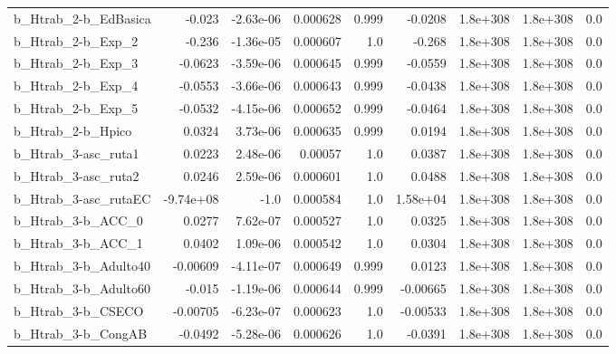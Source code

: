 \begin{tabular}{lrrrrrrrr}
b\_Htrab\_2-b\_EdBasica         &      -0.023 &    -2.63e-06 &  0.000628 &    0.999 &    -0.0208 &    1.8e+308 &     1.8e+308 &           0.0 \\
b\_Htrab\_2-b\_Exp\_2            &      -0.236 &    -1.36e-05 &  0.000607 &      1.0 &     -0.268 &    1.8e+308 &     1.8e+308 &           0.0 \\
b\_Htrab\_2-b\_Exp\_3            &     -0.0623 &    -3.59e-06 &  0.000645 &    0.999 &    -0.0559 &    1.8e+308 &     1.8e+308 &           0.0 \\
b\_Htrab\_2-b\_Exp\_4            &     -0.0553 &    -3.66e-06 &  0.000643 &    0.999 &    -0.0438 &    1.8e+308 &     1.8e+308 &           0.0 \\
b\_Htrab\_2-b\_Exp\_5            &     -0.0532 &    -4.15e-06 &  0.000652 &    0.999 &    -0.0464 &    1.8e+308 &     1.8e+308 &           0.0 \\
b\_Htrab\_2-b\_Hpico            &      0.0324 &     3.73e-06 &  0.000635 &    0.999 &     0.0194 &    1.8e+308 &     1.8e+308 &           0.0 \\
b\_Htrab\_3-asc\_ruta1          &      0.0223 &     2.48e-06 &   0.00057 &      1.0 &     0.0387 &    1.8e+308 &     1.8e+308 &           0.0 \\
b\_Htrab\_3-asc\_ruta2          &      0.0246 &     2.59e-06 &  0.000601 &      1.0 &     0.0488 &    1.8e+308 &     1.8e+308 &           0.0 \\
b\_Htrab\_3-asc\_rutaEC         &   -9.74e+08 &         -1.0 &  0.000584 &      1.0 &   1.58e+04 &    1.8e+308 &     1.8e+308 &           0.0 \\
b\_Htrab\_3-b\_ACC\_0            &      0.0277 &     7.62e-07 &  0.000527 &      1.0 &     0.0325 &    1.8e+308 &     1.8e+308 &           0.0 \\
b\_Htrab\_3-b\_ACC\_1            &      0.0402 &     1.09e-06 &  0.000542 &      1.0 &     0.0304 &    1.8e+308 &     1.8e+308 &           0.0 \\
b\_Htrab\_3-b\_Adulto40         &    -0.00609 &    -4.11e-07 &  0.000649 &    0.999 &     0.0123 &    1.8e+308 &     1.8e+308 &           0.0 \\
b\_Htrab\_3-b\_Adulto60         &      -0.015 &    -1.19e-06 &  0.000644 &    0.999 &   -0.00665 &    1.8e+308 &     1.8e+308 &           0.0 \\
b\_Htrab\_3-b\_CSECO            &    -0.00705 &    -6.23e-07 &  0.000623 &      1.0 &   -0.00533 &    1.8e+308 &     1.8e+308 &           0.0 \\
b\_Htrab\_3-b\_CongAB           &     -0.0492 &    -5.28e-06 &  0.000626 &      1.0 &    -0.0391 &    1.8e+308 &     1.8e+308 &           0.0 \\

\end{tabular}
